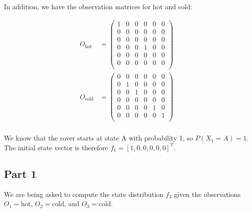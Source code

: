 \documentclass[12pt]{article}
\begin{document}
In addition,
we have the observation matrices for hot and cold:

\begin{align*}
    O_{\text{hot}} &= 
    \begin{pmatrix}
        1 & 0 & 0 & 0 & 0 & 0 \\
        0 & 0 & 0 & 0 & 0 & 0 \\
        0 & 0 & 0 & 0 & 0 & 0 \\
        0 & 0 & 0 & 1 & 0 & 0 \\
        0 & 0 & 0 & 0 & 0 & 0 \\
        0 & 0 & 0 & 0 & 0 & 0 \\
    \end{pmatrix} \\
    O_{\text{cold}} &= 
    \begin{pmatrix}
        0 & 0 & 0 & 0 & 0 & 0 \\
        0 & 1 & 0 & 0 & 0 & 0 \\
        0 & 0 & 1 & 0 & 0 & 0 \\
        0 & 0 & 0 & 0 & 0 & 0 \\
        0 & 0 & 0 & 0 & 1 & 0 \\
        0 & 0 & 0 & 0 & 0 & 1 \\
    \end{pmatrix} \\
\end{align*}

We know that the rover starts at state A with probability 1,
so $P(X_1 = A) = 1$.
The initial state vector is therefore $f_1 = [1, 0, 0, 0, 0, 0]^T$.

\subsection{Part 1}

We are being asked to compute the state distribution
$f_3$
given the observations 
$O_1 = \text{hot}$, $O_2 = \text{cold}$, and $O_3 = \text{cold}$.
\end{document}
